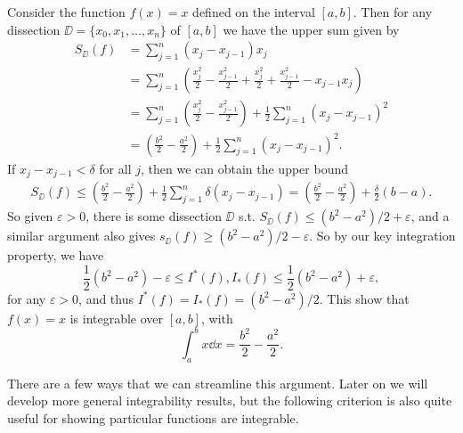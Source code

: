 \begin{example}[$f(x) = x$ is Integrable]
	Consider the function $f(x) = x$ defined on the interval $[a, b]$. Then for any dissection $\DD = \{x_0, x_1, \dots, x_n\}$ of $[a, b]$ we have the upper sum given by
	\begin{align*}
		S_{\DD}(f) &= \sum_{j = 1}^{n} (x_j - x_{j - 1}) x_j \\
				&= \sum_{j = 1}^n \left(\frac{x_j^2}{2} - \frac{x_{j - 1}^2}{2}+ \frac{x_j^2}{2} + \frac{x_{j-1}^2}{2}- x_{j - 1}x_j\right) \\
				&= \sum_{j = 1}^n \left(\frac{x_j^2}{2} - \frac{x_{j - 1}^2}{2}\right) +\frac{1}{2} \sum_{j = 1}^{n}\left(x_j - x_{j - 1}\right)^2 \\
				&= \left(\frac{b^2}{2} - \frac{a^2}{2}\right) +\frac{1}{2} \sum_{j = 1}^{n}\left(x_j - x_{j - 1}\right)^2.
	\end{align*}
	If $x_{j} - x_{j - 1} < \delta$ for all $j$, then we can obtain the upper bound
	\begin{align*}
		S_{\DD}(f) \leq \left(\frac{b^2}{2} - \frac{a^2}{2}\right) +\frac{1}{2} \sum_{j = 1}^{n}\delta\left(x_j - x_{j - 1}\right) = \left(\frac{b^2}{2} - \frac{a^2}{2}\right) + \frac{\delta}{2}(b - a).
	\end{align*}
	So given $\varepsilon > 0$, there is some dissection $\DD$ s.t. $S_{\DD}(f) \leq (b^2 - a^2)/2 + \varepsilon$, and a similar argument also gives $s_{\DD}(f) \geq (b^2 - a^2)/2 - \varepsilon$. So by our key integration property, we have
	$$
	\frac{1}{2}(b^2 - a^2) - \varepsilon \leq I^*(f), I_*(f) \leq \frac{1}{2}(b^2 - a^2) + \varepsilon,
	$$
	for any $\varepsilon > 0$, and thus $I^*(f) = I_*(f) = (b^2 - a^2)/2$. This show that $f(x) = x$ is integrable over $[a, b]$, with
	$$
	\int_a^b x \dd x = \frac{b^2}{2} - \frac{a^2}{2}.
	$$
\end{example}

There are a few ways that we can streamline this argument. Later on we will develop more general integrability results, but the following criterion is also quite useful for showing particular functions are integrable.

